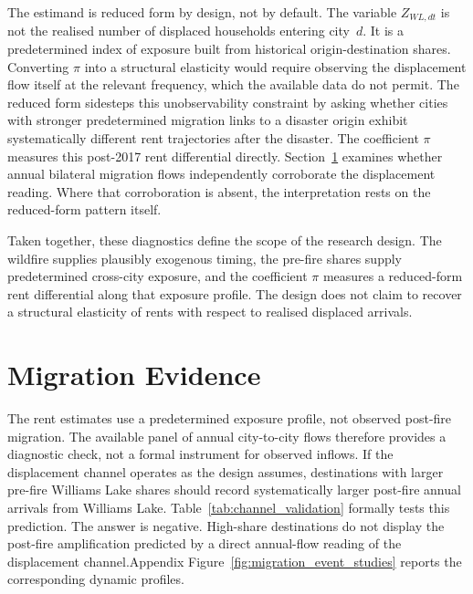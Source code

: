 \documentclass[12pt]{article}
\begin{document}
The estimand is reduced form by design, not by default. The variable $Z_{WL,dt}$
is not the realised number of displaced households entering city~$d$. It is a
predetermined index of exposure built from historical origin-destination shares.
Converting $\pi$ into a structural elasticity would require observing the
displacement flow itself at the relevant frequency, which the available data
do not permit. The reduced form sidesteps this unobservability
constraint by asking whether cities with stronger predetermined migration links
to a disaster origin exhibit systematically different rent trajectories after
the disaster. The coefficient $\pi$ measures
this post-2017 rent differential directly. Section~\ref{sec:channel} examines
whether annual bilateral migration flows independently corroborate the
displacement reading. Where that corroboration is absent, the interpretation
rests on the reduced-form pattern itself.

Taken together, these diagnostics define the scope of the research design. The
wildfire supplies plausibly exogenous timing, the pre-fire shares supply
predetermined cross-city exposure, and the coefficient $\pi$ measures a
reduced-form rent differential along that exposure profile. The design does not
claim to recover a structural elasticity of rents with respect to realised
displaced arrivals.
\FloatBarrier

\section{Migration Evidence}
\label{sec:channel}

The rent estimates use a predetermined exposure profile, not observed post-fire
migration. The available panel of annual city-to-city flows therefore provides a diagnostic
check, not a formal instrument for observed inflows. If the displacement channel
operates as the design assumes, destinations with larger pre-fire Williams Lake
shares should record systematically larger post-fire annual arrivals from Williams
Lake. Table~\ref{tab:channel_validation} formally tests this prediction. The answer is
negative. High-share destinations do not display the post-fire amplification
predicted by a direct annual-flow reading of the displacement channel.Appendix Figure~\ref{fig:migration_event_studies} reports the corresponding dynamic
profiles.
\end{document}
